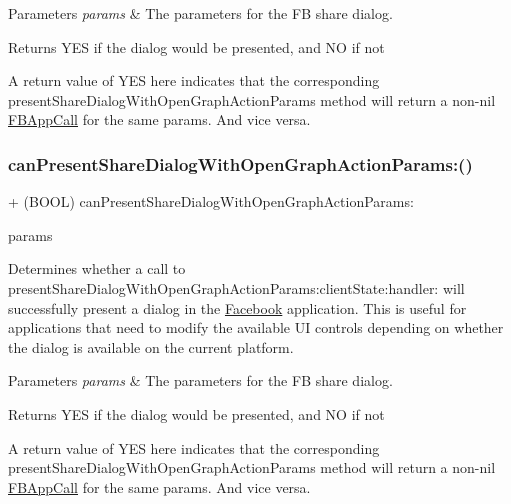 \begin{DoxyParams}{Parameters}
{\em params} & The parameters for the FB share dialog.\\
\hline
\end{DoxyParams}
\begin{DoxyReturn}{Returns}
Y\+ES if the dialog would be presented, and NO if not
\end{DoxyReturn}
A return value of Y\+ES here indicates that the corresponding present\+Share\+Dialog\+With\+Open\+Graph\+Action\+Params method will return a non-\/nil \hyperlink{interfaceFBAppCall}{F\+B\+App\+Call} for the same params. And vice versa. \mbox{\label{interfaceFBDialogs_ad8921a3906d28210cad0c0871e99f4bd}} 
\subsubsection{\texorpdfstring{can\+Present\+Share\+Dialog\+With\+Open\+Graph\+Action\+Params\+:()}{canPresentShareDialogWithOpenGraphActionParams:()}\hspace{0.1cm}{\footnotesize\ttfamily [5/5]}}
{\footnotesize\ttfamily + (B\+O\+OL) can\+Present\+Share\+Dialog\+With\+Open\+Graph\+Action\+Params\+: \begin{DoxyParamCaption}\item[{(\hyperlink{interfaceFBOpenGraphActionParams}{F\+B\+Open\+Graph\+Action\+Params} $\ast$)}]{params }\end{DoxyParamCaption}}

Determines whether a call to present\+Share\+Dialog\+With\+Open\+Graph\+Action\+Params\+:client\+State\+:handler\+: will successfully present a dialog in the \hyperlink{interfaceFacebook}{Facebook} application. This is useful for applications that need to modify the available UI controls depending on whether the dialog is available on the current platform.


\begin{DoxyParams}{Parameters}
{\em params} & The parameters for the FB share dialog.\\
\hline
\end{DoxyParams}
\begin{DoxyReturn}{Returns}
Y\+ES if the dialog would be presented, and NO if not
\end{DoxyReturn}
A return value of Y\+ES here indicates that the corresponding present\+Share\+Dialog\+With\+Open\+Graph\+Action\+Params method will return a non-\/nil \hyperlink{interfaceFBAppCall}{F\+B\+App\+Call} for the same params. And vice versa. \mbox{\label{interfaceFBDialogs_a36e9e390bb8c6040e6027b647ed587e8}} 
